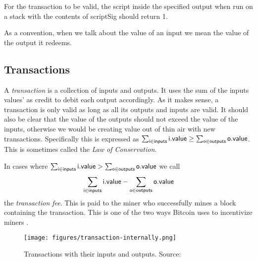 For the transaction to be valid, the script inside the specified output when run on a stack with the contents of \textsf{scriptSig} should return 1.

As a convention, when we talk about the value of an input we mean the value of the output it redeems.

\subsection{Transactions}



A \emph{transaction} is a collection of inputs and outputs. It uses the sum of the inputs values' as credit to debit each output accordingly. As it makes sense, a transaction is only valid as long as all its outputs and inputs are valid. It should also be clear that the value of the outputs should not exceed the value of the inputs, otherwise we would be creating value out of thin air with new transactions. Specifically this is expressed as $\sum_{\sf i \in inputs} {\sf i.value} \ge \sum_{\sf o \in outputs} {\sf o.value}$. This is sometimes called the \emph{Law of Conservation}.

In cases where $\sum_{\sf i \in inputs} {\sf i.value} > \sum_{\sf o \in outputs} {\sf o.value}$ we call
$$\sum_{\sf i \in inputs} {\sf i.value} - \sum_{\sf o \in outputs} {\sf o.value}$$
the \emph{transaction fee}. This is paid to the miner who successfully mines a block containing the transaction. This is one of the two ways Bitcoin uses to incentivize miners .

\begin{figure}
  \centering
  \texttt{[image: figures/transaction-internally.png]}
  \caption{Transactions with their inputs and outputs.  Source:~\cite{mastering}}
  \label{fig:transaction-internally}
\end{figure}

